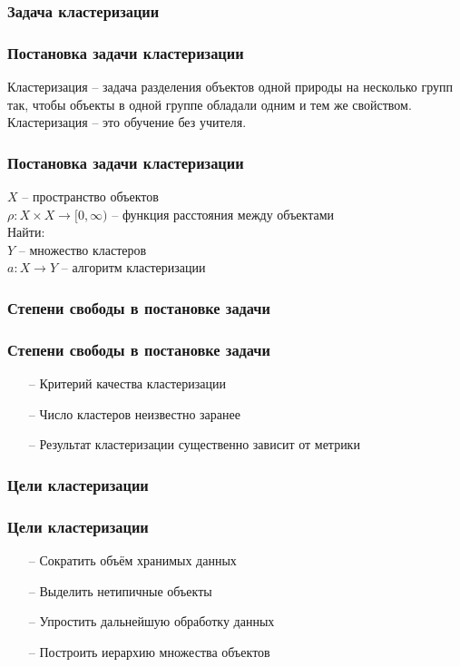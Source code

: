 \documentclass[12pt]{beamer}
\begin{document}
\begin{frame}\frametitle{Задача кластеризации}
\end{frame}

\begin{frame}\frametitle{Постановка задачи кластеризации}
Кластеризация -- задача разделения объектов одной природы на несколько групп так, чтобы объекты в одной группе обладали одним и тем же свойством.\\
\vspace{5mm}
Кластеризация -- это обучение без учителя.
\end{frame}

\begin{frame}\frametitle{Постановка задачи кластеризации}
$X$ -- пространство объектов\\
$\rho: X \times X \rightarrow [0, \infty)$ -- функция расстояния между объектами\\
\vspace{5mm}
Найти:\\
$Y$ -- множество кластеров \\
$a: X \rightarrow Y$ -- алгоритм кластеризации
\vspace{5mm}

\end{frame}

\begin{frame}\frametitle{Степени свободы в постановке задачи}
\end{frame}

\begin{frame}\frametitle{Степени свободы в постановке задачи}
	\begin{itemize}
		\item[--] Критерий качества кластеризации
		\item[--] Число кластеров неизвестно заранее
		\item[--] Результат кластеризации существенно зависит от метрики
	\end{itemize}
\end{frame}

\begin{frame}\frametitle{Цели кластеризации}
\end{frame}

\begin{frame}\frametitle{Цели кластеризации}
	\begin{itemize}
		\item[--] Сократить объём хранимых данных
		\item[--] Выделить нетипичные объекты
		\item[--] Упростить дальнейшую обработку данных
		\item[--] Построить иерархию множества объектов				
	\end{itemize}
\end{frame}
\end{document}
